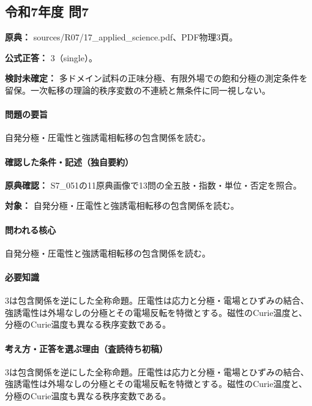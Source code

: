 \subsection{令和7年度 問7}
\label{q:r07-reg-applied-07}

\noindent\textbf{原典：} sources/R07/17\_applied\_science.pdf、PDF物理3頁。

\textbf{公式正答：} 3（single）。

\par\textbf{検討未確定：} 多ドメイン試料の正味分極、有限外場での飽和分極の測定条件を留保。一次転移の理論的秩序変数の不連続と無条件に同一視しない。

\paragraph{問題の要旨} 自発分極・圧電性と強誘電相転移の包含関係を読む。

\paragraph{確認した条件・記述（独自要約）}\mbox{}\par

\noindent\textbf{原典確認：} S7\_051の11原典画像で13問の全五肢・指数・単位・否定を照合。\par

\noindent\textbf{対象：} 自発分極・圧電性と強誘電相転移の包含関係を読む。\par

\paragraph{問われる核心} 自発分極・圧電性と強誘電相転移の包含関係を読む。

\paragraph{必要知識} 3は包含関係を逆にした全称命題。圧電性は応力と分極・電場とひずみの結合、強誘電性は外場なしの分極とその電場反転を特徴とする。磁性のCurie温度と、分極のCurie温度も異なる秩序変数である。

\paragraph{考え方・正答を選ぶ理由（査読待ち初稿）} 3は包含関係を逆にした全称命題。圧電性は応力と分極・電場とひずみの結合、強誘電性は外場なしの分極とその電場反転を特徴とする。磁性のCurie温度と、分極のCurie温度も異なる秩序変数である。

